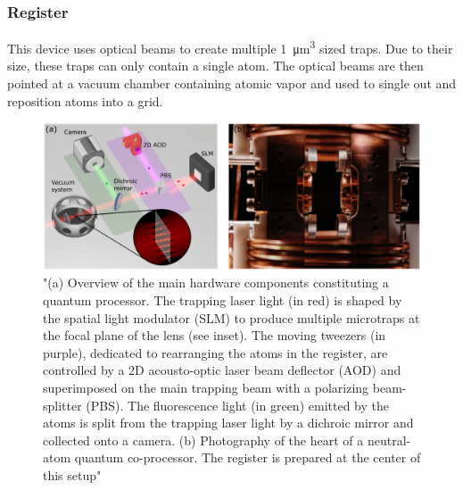 \subsubsection{Register}
This device uses optical beams to create multiple \SI{1}{\micro\meter\cubed} sized traps\cite{schlosserSubpoissonianLoadingSingle2001}.
Due to their size, these traps can only contain a single atom. The optical beams are then pointed at a vacuum chamber containing atomic vapor and used to single out and reposition atoms into a grid.
\begin{figure}[h]
  \centering
  \includegraphics[width=170mm]{./Images/registerHardware.png}
  \caption{"(a) Overview of the main hardware components constituting a quantum processor. The trapping laser light (in red) is shaped by the spatial light modulator (SLM) to produce multiple microtraps at the focal plane of the lens (see inset). The moving tweezers (in purple), dedicated to rearranging the atoms in the register, are controlled by a 2D acousto-optic laser beam deflector (AOD) and superimposed on the main trapping beam with a polarizing beam-splitter (PBS). The fluorescence light (in green) emitted by the atoms is split from the trapping laser light by a dichroic mirror and collected onto a camera. (b) Photography of the heart of a neutral-atom quantum co-processor. The register is prepared at the center of this setup"\cite{henrietQuantumComputingNeutral2020}} 
  \label{fig:hardwareregister}
\end{figure}
